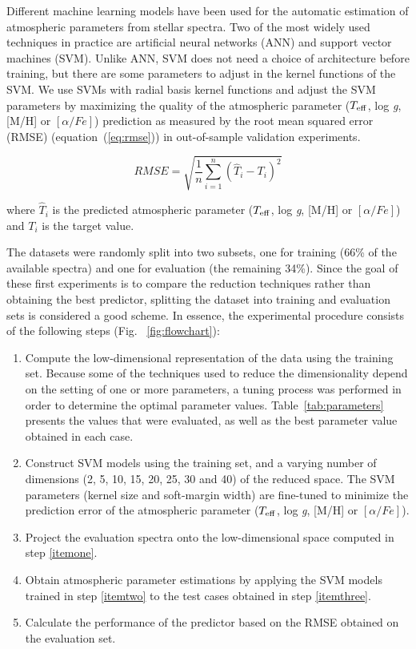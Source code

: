 \documentclass[a4paper,fleqn,usenatbib]{mnras}
\begin{document}
{{{Different machine learning models have been used for the automatic
estimation of atmospheric parameters from stellar spectra. Two of the
most widely used techniques in practice are artificial neural networks
(ANN) and support vector machines (SVM). Unlike ANN, SVM does not need
a choice of architecture before training, but there are some
parameters to adjust in the kernel functions of the SVM. We use SVMs
with radial basis kernel functions and adjust the SVM parameters by
maximizing the quality of the atmospheric parameter ($T_{\rm eff}$,
log \textit{g}, [M/H] or $\left[ \alpha/Fe \right]$) prediction as 
measured by the root mean squared error (RMSE) (equation~(\ref{eq:rmse})) 
in out-of-sample validation experiments.

\begin{equation}
\label{eq:rmse}
RMSE=\sqrt{\frac{1}{n}\sum_{i=1}^{n}\left(\hat{T}_{i}-T_{i}\right)^{2}}
\end{equation}

where $\hat{T}_{i}$ is the predicted atmospheric parameter ($T_{\rm eff}$, 
  log \textit{g}, [M/H] or $\left[ \alpha/Fe \right]$) and 
  $T_{i}$ is the target value. 
  
The datasets were randomly split into two subsets, one for training
(66\% of the available spectra) and one for evaluation (the remaining
34\%). Since the goal of these first experiments is to compare the
reduction techniques rather than obtaining the best predictor,
splitting the dataset into training and evaluation sets is considered
a good scheme. In essence, the experimental procedure consists of the
following steps (Fig.~ \ref{fig:flowchart}):

\begin{enumerate}
\item \label{itemone} Compute the low-dimensional representation of
  the data using the training set. Because some of the techniques used
  to reduce the dimensionality depend on the setting of one or more
  parameters, a tuning process was performed in order to determine the
  optimal parameter values. Table~\ref{tab:parameters} presents the
  values that were evaluated, as well as the best parameter value
  obtained in each case.
\item \label{itemtwo} Construct SVM models using the training set, and a varying
  number of dimensions (2, 5, 10, 15, 20, 25, 30 and 40) of the
  reduced space. The SVM parameters (kernel size and soft-margin
  width) are fine-tuned to minimize the prediction error of the
  atmospheric parameter ($T_{\rm eff}$, log \textit{g}, [M/H] or 
  $\left[ \alpha/Fe \right]$).
\item \label{itemthree} Project the evaluation spectra onto the
  low-dimensional space computed in step \ref{itemone}.
\item Obtain atmospheric parameter estimations by applying the SVM
  models trained in step \ref{itemtwo} to the test cases obtained in
  step \ref{itemthree}.
\item Calculate the performance of the predictor based on the RMSE
  obtained on the evaluation set.
\end{enumerate}

}}}
\end{document}
